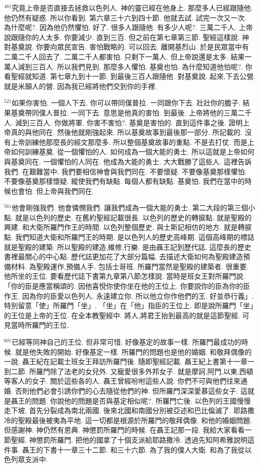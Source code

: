 \documentclass{book}
\begin{document}
$^{481}$究竟上帝是否直接去拯救以色列人.
神的靈已經在他身上.
那麼多人已經跟隨他.
他仍然有疑惑.
所以你看到.
第六章三十六到四十節.
他就去試.
試完一次又一次.
為什麼呢?.
因為他仍然懼怕.
好了.
很多人跟隨他.
有多少人呢?.
三萬二千人.
上帝說跟隨你的人太多.
你要減少.
直到三百.
但之前在第七章第三節.
聖經這樣說.
神對基奠說.
你要向眾民宣告.
害怕戰略的.
可以回去.
離開基烈山.
於是民眾當中有二萬二千人回去了.
二萬二千人都害怕.
只剩下一萬人.
但上帝說還是太多.
結果一萬人減到三百人.
所以我們見到.
那麼多人懼怕.
基奠也怕.
為什麼知道他怕呢?.
你看聖經就知道.
第七章九到十一節.
到最後三百人跟隨他.
對基奠說.
起來,下去公營.
就是米顛人的營.
因為我已經將他們交到你的手裡.

$^{521}$如果你害怕.
一個人下去.
你可以帶同僕普拉.
一同跟你下去.
壯壯你的膽子.
結果基奠帶同僕人普拉.
一同下去.
意思是他真的害怕.
到最後.
上帝將他的三萬二千人.
減到三百人.
你做將軍.
你害不害怕?.
基奠是害怕的.
直到這件事之後.
證明上帝真的與他同在.
然後他就剛強起來.
所以基奠故事到最後那一部分.
所記載的.
沒有上帝訓練他那麼長的經文那麼多.
所以整個基奠故事的重點.
不是去打仗.
而是上帝如何訓練基奠.
從一個懼怕的人.
如何成為一個大能的勇士.
所以這就是上帝如何與基奠同在.
一個懼怕的人同在.
他成為大能的勇士.
大大戰勝了這些人.
這裡告訴我們.
在艱難當中.
我們要相信神會與我們同在.
不要懷疑.
不要像基奠那樣懼怕.
不要像基奠那樣懷疑.
縱使我們有缺點.
每個人都有缺點.
基奠怕.
我們在當中的時候也會怕.
但上帝與我們同在.

$^{561}$他會剛強我們.
他會憐憫我們.
讓我們成為一個大能的勇士.
第二大段的第三個小點.
就是以色列的歷史.
在舊約聖經記載很長.
以色列的歷史的轉捩點.
就是聖殿的興建.
和大衛所羅門作王的時間.
以色列整個歷史.
與士斯記相仿的地方.
就是轉捩點.
我們知道大衛和所羅門王的時期.
是以色列人的歷史高峰期.
這個高峰期的標誌就是聖殿的建築.
所以聖殿的建造,維修,行樂.
是由聶王記到歷代誌.
這麼長的歷史書裡最關心的中心點.
歷代誌更加花了大部分篇幅.
去描述大衛如何為聖殿建造預備材料.
為聖殿運作,預備人手.
包括士哥班.
所羅門當然是聖殿的建築者.
很重要.
他所坐的王位.
要看歷代誌下書第九章第八節怎樣說.
當時是班女王對所羅門說.
「你的臣是應當稱頌的.
因他喜悅你使你坐在他的王位上.
你要說你的臣為你的臣作王.
因為你的臣愛以色列人.
永遠建立你.
所以他立你作他們的王.
好並恭行義」.
特別留意「使」所羅門「坐」.
「坐」在「他」指臣的王位上.
即是說所羅門「坐」的王位是上帝的王位.
在全本教聖經中.
將人,將君王抬到最高的就是這節聖經.
可見當時所羅門的王位.

$^{601}$已經等同神自己的王位.
但非常可惜.
好像基定的故事一樣.
所羅門最成功的時候.
就是他失敗的開始.
好像基定一樣.
所羅門的問題也是他的婚姻.
和敬拜偶像的一說.
聶王紀在記載士班女王拜訪所羅門後.
隨即聖經記載.
聶王紀上書第十一章一到二節.
所羅門除了法老的女兒外.
又寵愛很多外邦女子.
就是摩訶,阿門,以東,西頓等客人的女子.
關於這些各的人.
聶王曾經吩咐這些人說.
你們不可與他們往來通婚.
否則他們必會引誘你們的心去隨從他們的神.
但所羅門深深愛慕這些女子.
這就是聶王的問題.
你說他的問題是否與基定相似呢?.
所羅門亡後.
以色列的王國慢慢走下坡.
首先分裂成為南北兩國.
後來北國和南國分別被亞述和巴比倫滅了.
耶路撒冷的聖殿最後被夷為平地.
這一切都是根源於所羅門的敬拜偶像.
和他的婚姻問題.
但感謝神.
神仍然有恩典.
神懲罰所羅門的時候.
在聶王記那一段.
我給大家看看一節聖經.
神懲罰所羅門.
把他的國拿了十個支派給耶路撒冷.
透過先知阿希雅說明這件事.
聶王的下書十一章三十二節.
和三十六節.
為了我的僕人大衛.
和為了我從以色列眾支派中.
\end{document}

